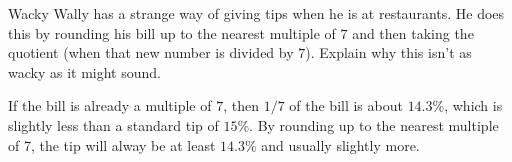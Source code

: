 \documentclass[nooutcomes]{ximera}
\begin{document}
\begin{problem}Wacky Wally has a strange way of giving tips when he is at
  restaurants. He does this by rounding his bill up to the nearest
  multiple of $7$ and then taking the quotient (when that new number
  is divided by $7$). Explain why this isn't as wacky as it might
  sound.
\begin{freeResponse}
\begin{hint}
If the bill is already a multiple of $7$, then $1/7$ of the bill is about $14.3\%$, which is slightly less than a standard tip of $15\%$.  By rounding up to the nearest multiple of 7, the tip will alway be at least $14.3\%$ and usually slightly more.  
\end{hint}
\end{freeResponse}
\end{problem} 


%
\end{document}
